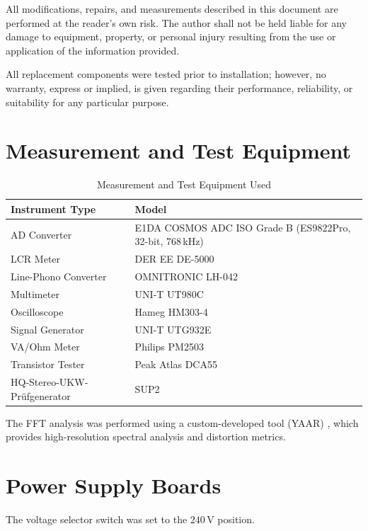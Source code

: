\documentclass[]{article}
\begin{document}
All modifications, repairs, and measurements described in this document are performed at the reader's own risk. The author shall not be held liable for any damage to equipment, property, or personal injury resulting from the use or application of the information provided.

All replacement components were tested prior to installation; however, no warranty, express or implied, is given regarding their performance, reliability, or suitability for any particular purpose.

\section{Measurement and Test Equipment}

\begin{table}[H]
	\centering
	\caption{Measurement and Test Equipment Used}
	\label{tab:tools}
	\begin{tabular}{ll}
		\hline
		\textbf{Instrument Type} & \textbf{Model} \\
		\hline
		AD Converter & E1DA COSMOS ADC ISO Grade B (ES9822Pro, 32-bit, 768\,kHz) \\
		LCR Meter & DER EE DE-5000 \\
		Line-Phono Converter & OMNITRONIC LH-042 \\
		Multimeter & UNI-T UT980C \\
		Oscilloscope & Hameg HM303-4 \\
		Signal Generator & UNI-T UTG932E \\
		VA/Ohm Meter & Philips PM2503 \\
        Transistor Tester & Peak Atlas DCA55 \\
        HQ-Stereo-UKW-Prüfgenerator & SUP2  \\
		\hline
	\end{tabular}
\end{table}

The FFT analysis was performed using a custom-developed tool (YAAR) \cite{yaar}, which provides high-resolution spectral analysis and distortion metrics.

\section{Power Supply Boards}

The voltage selector switch was set to the $240\,\mathrm{V}$ position.
\end{document}

